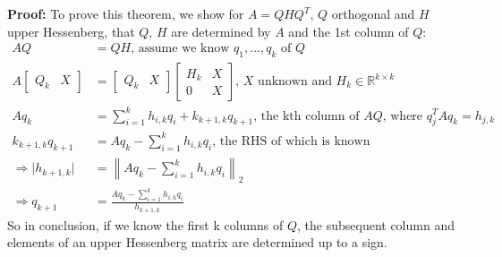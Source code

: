 \documentclass{article}
\newcommand{\norm}[2]{\left\lVert#1\right\rVert_#2}
\newcommand{\abs}[1]{\lvert#1\rvert}
\begin{document}
\textbf{Proof:} To prove this theorem, we show for $A = QHQ^T$, $Q$ orthogonal and $H$ upper Hessenberg, that $Q$, $H$ are determined by $A$ and the 1st column of $Q$:
\begin{align*}
    AQ & = QH \textrm{, assume we know } q_1, \dots, q_k \textrm{ of } Q \\
    A \begin{bmatrix} Q_k & X \end{bmatrix} &= 
        \begin{bmatrix} Q_k & X \end{bmatrix} 
        \begin{bmatrix} H_k & X \\ 0 & X \end{bmatrix} \textrm{, $X$ unknown and } H_k \in \mathbb{R}^{k \times k}\\
    Aq_k &= \sum_{i=1}^kh_{i,k}q_i + k_{k+1,k}q_{k+1} \textrm{, the kth column of $AQ$, where } q_j^TAq_k = h_{j,k}\\
    k_{k+1,k}q_{k+1} &= Aq_k - \sum_{i=1}^kh_{i,k}q_i \textrm{, the RHS of which is known}\\
    \Rightarrow \abs{h_{k+1,k}} &= \norm{Aq_k - \sum_{i=1}^kh_{i,k}q_i}{2}\\
    \Rightarrow q_{k+1} &= \frac{Aq_k - \sum_{i=1}^kh_{i,k}q_i}{h_{k+1,k}}
\end{align*}
So in conclusion, if we know the first k columns of $Q$, the subsequent column and elements of an upper Hessenberg matrix are determined up to a sign.
\end{document}

